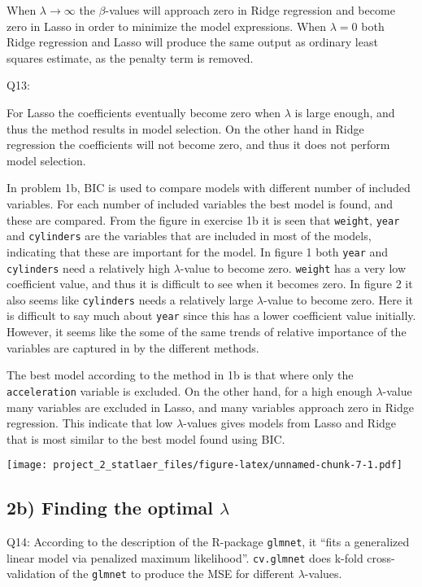 \documentclass[]{article}
\begin{document}
When \(\lambda \rightarrow \infty\) the \(\beta\)-values will approach
zero in Ridge regression and become zero in Lasso in order to minimize
the model expressions. When \(\lambda = 0\) both Ridge regression and
Lasso will produce the same output as ordinary least squares estimate,
as the penalty term is removed.

Q13:

For Lasso the coefficients eventually become zero when \(\lambda\) is
large enough, and thus the method results in model selection. On the
other hand in Ridge regression the coefficients will not become zero,
and thus it does not perform model selection.

In problem 1b, BIC is used to compare models with different number of
included variables. For each number of included variables the best model
is found, and these are compared. From the figure in exercise 1b it is
seen that \texttt{weight}, \texttt{year} and \texttt{cylinders} are the
variables that are included in most of the models, indicating that these
are important for the model. In figure 1 both \texttt{year} and
\texttt{cylinders} need a relatively high \(\lambda\)-value to become
zero. \texttt{weight} has a very low coefficient value, and thus it is
difficult to see when it becomes zero. In figure 2 it also seems like
\texttt{cylinders} needs a relatively large \(\lambda\)-value to become
zero. Here it is difficult to say much about \texttt{year} since this
has a lower coefficient value initially. However, it seems like the some
of the same trends of relative importance of the variables are captured
in by the different methods.

The best model according to the method in 1b is that where only the
\texttt{acceleration} variable is excluded. On the other hand, for a
high enough \(\lambda\)-value many variables are excluded in Lasso, and
many variables approach zero in Ridge regression. This indicate that low
\(\lambda\)-values gives models from Lasso and Ridge that is most
similar to the best model found using BIC.

\texttt{[image: project\_2\_statlaer\_files/figure-latex/unnamed-chunk-7-1.pdf]}

\subsection{\texorpdfstring{2b) Finding the optimal
\(\lambda\)}{2b) Finding the optimal \textbackslash{}lambda}}\label{b-finding-the-optimal-lambda}

Q14: According to the description of the R-package \texttt{glmnet}, it
``fits a generalized linear model via penalized maximum likelihood''.
\texttt{cv.glmnet} does k-fold cross-validation of the \texttt{glmnet}
to produce the MSE for different \(\lambda\)-values.
\end{document}
